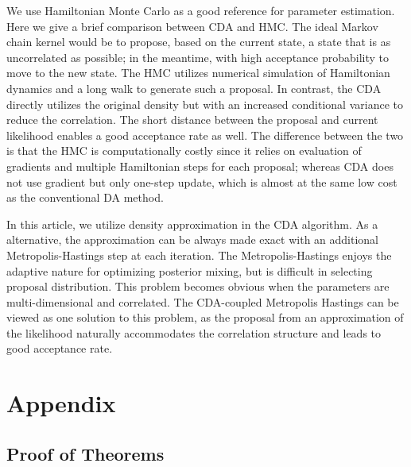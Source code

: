 \documentclass[10pt]{article}
\begin{document}
 We use Hamiltonian Monte Carlo as a good reference for parameter estimation. Here we give a brief comparison between CDA and HMC.  The ideal Markov chain kernel  would be to propose, based on the current state, a state that is as uncorrelated as possible; in the meantime, with high acceptance probability to move to the new state. The HMC utilizes numerical simulation of Hamiltonian dynamics and a long walk to generate such a proposal. In contrast, the CDA directly utilizes the original density but with an increased conditional variance to reduce the correlation. The  short distance between the proposal and current likelihood  enables a good acceptance rate as well. The difference between the two is that the HMC is computationally costly since it relies on evaluation of gradients and multiple Hamiltonian steps for each proposal; whereas CDA does not use gradient but only one-step update, which is almost at the same low cost as the conventional DA method. 

In this article, we utilize density approximation in the CDA algorithm. As a alternative, the approximation can be always made exact with an additional Metropolis-Hastings step at each iteration. The Metropolis-Hastings enjoys the adaptive nature for optimizing posterior mixing, but is difficult in selecting proposal distribution. This problem becomes obvious when the parameters are multi-dimensional and correlated. The CDA-coupled Metropolis Hastings can be viewed as one solution to this problem, as the proposal from an approximation of the likelihood naturally accommodates the correlation structure and leads to good acceptance rate.






\section{Appendix}

\subsection{Proof of Theorems}
\end{document}
